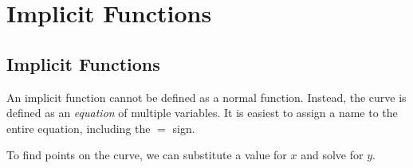 \chapter{Implicit Functions}
\label{chp:implicit_functions}


\section{Implicit Functions}

An implicit function cannot be defined as a normal function. Instead, the curve is defined as an \textit{equation} of multiple variables. It is easiest to assign a name to the entire equation, including the $=$ sign.

\begin{maplegroup}
\begin{mapleinput}
\end{mapleinput}
\mapleresult
\begin{maplelatex}
\end{maplelatex}
\end{maplegroup}


\noindent
To find points on the curve, we can substitute a value for $x$ and solve for $y$.

\begin{maplegroup}
\begin{mapleinput}
\end{mapleinput}
\mapleresult
\begin{maplelatex}
\end{maplelatex}
\end{maplegroup}

\begin{maplegroup}
\begin{mapleinput}
\end{mapleinput}
\mapleresult
\begin{maplelatex}
\end{maplelatex}
\end{maplegroup}

